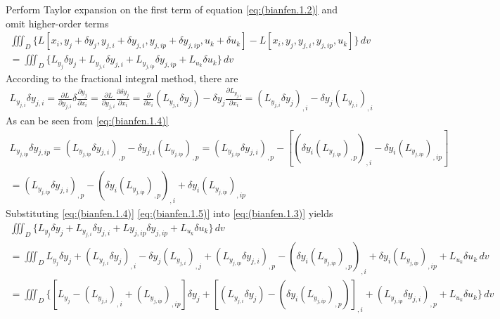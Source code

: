 Perform Taylor expansion on the first term of equation \ref{eq:(bianfen.1.2)} and omit higher-order terms
\begin{multline}\label{eq:(bianfen.1.3)}    
\iiint_D \{L[x_i,y_j+\delta y_j,y_{j,i}+\delta y_{j,i},y_{j,ip}+\delta y_{j,ip},u_k+\delta u_k]-L[x_i,y_j,y_{j,i},y_{j,ip},u_k] \}\,dv 
\\=\iiint_D \{L_{y_j} \delta y_j + L_{y_{j,i}} \delta y_{j,i}+L_{y_{j,ip}} \delta y_{j,ip} +L_{u_k} \delta u_k\}\,dv 
\end{multline}
According to the fractional integral method, there are
\begin{multline}\label{eq:(bianfen.1.4)}
L_{y_{j,i}} \delta y_{j,i}
=\frac{\partial L}{\partial y_{j,i}} \delta {\frac{\partial y_j}{\partial x_i}} 
=\frac{\partial L}{\partial y_{j,i}} \frac{\partial {\delta y_j}}{\partial x_i}
=\frac{\partial} {\partial x_i} \left(L_{y_{j,i}} \delta y_j \right)-\delta y_j \frac{\partial L_{y_{j,i}} } {\partial x_i} 
=\left(L_{y_{j,i}} \delta y_j \right)_{,i}-\delta y_j \left(L_{y_{j,i}}\right)_{,i }
\end{multline}
As can be seen from \ref{eq:(bianfen.1.4)}
\begin{multline}\label{eq:(bianfen.1.5)}
L_{y_{j,ip}} \delta y_{j,ip}
=\left(L_{y_{j,ip}} \delta y_{j,i} \right)_{,p}-\delta y_{j,i} \left(L_{y_{j,ip}}\right)_{,p}
=\left(L_{y_{j,ip}} \delta y_{j,i} \right)_{,p}-\left[\left(\delta y_{i} \left(L_{y_{j,ip}}\right)_{,p}\right)_{,i}-\delta y_{i} \left(L_{y_{j,ip}}\right)_{,ip}\right]\\
=\left(L_{y_{j,ip}} \delta y_{j,i} \right)_{,p}-\left(\delta y_{i} \left(L_{y_{j,ip}}\right)_{,p}\right)_{,i}+\delta y_{i} \left(L_{y_{j,ip}}\right)_{,ip}
\end{multline}
Substituting \ref{eq:(bianfen.1.4)} \ref{eq:(bianfen.1.5)} into \ref{eq:(bianfen.1.3)} yields
\begin{multline} \label{eq:(bianfen.1.6)}
\iiint_D \{L_{y_j} \delta y_j + L_{y_{j,i}} \delta y_{j,i}+L{y_{j,ip} \delta y_{j,ip} +L_{u_k} \delta u_k}\} \,dv 
\\=\iiint_D L_{y_j} \delta y_j +\left(L_{y_{j,i}} \delta y_j \right)_{,i}-\delta y_j \left(L_{y_{j,i}}\right)_{,j } +\left(L_{y_{j,ip}} \delta y_{j,i} \right)_{,p}-\left(\delta y_{i} \left(L_{y_{j,ip}}\right)_{,p}\right)_{,i}+\delta y_{i} \left(L_{y_{j,ip}}\right)_{,ip}+L_{u_k} \delta u_k \,dv 
\\=\iiint_D \{[L_{y_j} - \left(L_{y_{j,i}}\right)_{,i}+\left(L_{y_{j,ip}}\right)_{,ip}]\delta y_j +[\left(L_{y_{j,i}} \delta y_j \right) -\left(\delta y_{i} \left(L_{y_{j,ip}}\right)_{,p}\right)]_{,i}+\left(L_{y_{j,ip}} \delta y_{j,i} \right)_{,p}+L_{u_k} \delta u_k\}\,dv 
\end{multline}
